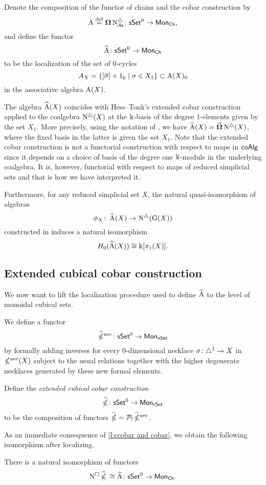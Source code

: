 Denote the composition of the functor of chains and the cobar construction by
\[
\operatorname{A} \stackrel{\mathrm{def}}{=} \operatorname{\mathbf{\Omega}} \operatorname{N^{\triangle}_{\!{\mathcal{A}\mathsf{s}}}} \colon \mathsf{sSet}^0 \to \mathsf{Mon}_{\mathsf{Ch}},
\]
and define the functor
\[
\operatorname{\widehat{A}} \colon \mathsf{sSet}^0 \to \mathsf{Mon}_{\mathsf{Ch}}
\]
to be the localization of the set of $0$-cycles
\[
A_X = \{ [\overline{\sigma}]+1_\Bbbk \mid \sigma \in X_1 \} \subset \operatorname{A}(X)_0
\]
in the associative algebra $\operatorname{A}(X)$.

The algebra $\operatorname{\widehat{A}}(X)$ coincides with Hess--Tonk's extended cobar construction applied to the coalgebra $\operatorname{N^{\triangle}}(X)$ at the $\Bbbk$-basis of the degree $1$-elements given by the set $X_1$.
More precisely, using the notation of \cite{hess2010cobar}, we have $\operatorname{\widehat{A}}(X) = \widehat{\operatorname{\mathbf{\Omega}}} \operatorname{N^{\triangle}}(X)$, where the fixed basis in the latter is given the set $X_1$.
Note that the extended cobar construction is not a functorial construction with respect to maps in $\mathsf{coAlg}$ since it depends on a choice of basis of the degree one $\Bbbk$-module in the underlying coalgebra.
It is, however, functorial with respect to maps of reduced simplicial sets and that is how we have interpreted it.

Furthermore, for any reduced simplicial set $X$, the natural quasi-isomorphism of algebras
\[
\phi_X \colon \operatorname{\widehat{A}}(X) \to \operatorname{N^{\triangle}}(\operatorname{G}(X))
\]
constructed in \cite{hess2010cobar} induces a natural isomorphism
\[
H_0(\operatorname{\widehat{A}}(X)) \cong \Bbbk[\pi_1(X)].
\]

\subsection{Extended cubical cobar construction} \label{ss:extended cubical cobar}

We now want to lift the localization procedure used to define $\operatorname{\widehat{A}}$ to the level of monoidal cubical sets.

We define a functor
\[
\operatorname{\widehat{\mathbb{\Omega}}^{\mathrm{nec}}} \colon \mathsf{sSet}^0 \to \mathsf{Mon}_{\mathsf{nSet}}
\]
by formally adding inverses for every $0$-dimensional necklace $\sigma \colon \triangle^1 \to X$ in $\operatorname{\mathbb{\Omega}^{\mathrm{nec}}}(X)$ subject to the usual relations together with the higher degenerate necklaces generated by these new formal elements.

Define the \textit{extended cubical cobar construction}
\[
\operatorname{\widehat{\mathbb{\Omega}}} \colon \mathsf{sSet}^0 \to \mathsf{Mon}_{\mathsf{cSet}}
\]
to be the composition of functors $\operatorname{\widehat{\mathbb{\Omega}}} = \mathcal{P}_{!} \operatorname{\widehat{\mathbb{\Omega}}^{\mathrm{nec}}}$.

As an immediate consequence of \cref{l:ccobar and cobar}, we obtain the following isomorphism after localizing.

\begin{corollary}
	There is a natural isomorphism of functors
	\[
	\operatorname{N^{\square}} \operatorname{\widehat{\mathbb{\Omega}}} \, \cong \operatorname{\widehat{A}} \colon \mathsf{sSet}^0 \to \mathsf{Mon}_{\mathsf{Ch}}.
	\]
\end{corollary}


